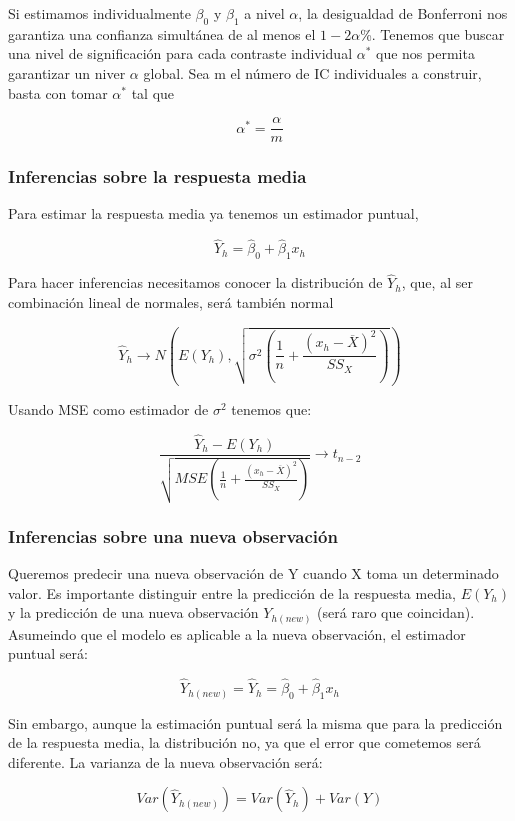Si estimamos individualmente $\beta_0$ y $\beta_1$ a nivel $\alpha$, la desigualdad de Bonferroni nos garantiza una confianza simultánea de al menos el $1-2\alpha$\%.
Tenemos que buscar una nivel de significación para cada contraste individual $\alpha^*$ que nos permita garantizar un niver $\alpha$ global. Sea m el número de IC individuales a construir, basta con tomar $\alpha^*$ tal que

$$
\alpha^*=\frac{\alpha}{m}
$$

\subsubsection{Inferencias sobre la respuesta media}

Para estimar la respuesta media ya tenemos un estimador puntual,

$$
\hat Y_h=\hat\beta_0+\hat\beta_1x_h
$$

Para hacer inferencias necesitamos conocer la distribución de $\hat Y_h$, que, al ser combinación lineal de normales, será también normal

$$
\hat Y_h\longrightarrow N\left(E(Y_h),\sqrt{\sigma^2\left(\frac{1}{n}+\frac{(x_h-\overline{X})^2}{SS_X}\right)}\right)
$$

Usando MSE como estimador de $\sigma^2$ tenemos que:

$$
\frac{\hat Y_h-E(Y_h)}{\sqrt{MSE\left(\frac{1}{n}+\frac{(x_h-\overline{X})^2}{SS_X}\right)}}\longrightarrow t_{n-2}
$$

\subsubsection{Inferencias sobre una nueva observación}

Queremos predecir una nueva observación de Y cuando X toma un determinado valor. Es importante distinguir entre la predicción de la respuesta media, $E(Y_h)$ y la predicción de una nueva observación $Y_{h(new)}$ (será raro que coincidan).
Asumeindo que el modelo es aplicable a la nueva observación, el estimador puntual será:

$$
\hat Y_{h(new)}=\hat Y_h=\hat\beta_0+\hat\beta_1x_h
$$

Sin embargo, aunque la estimación puntual será la misma que para la predicción de la respuesta media, la distribución no, ya que el error que cometemos será diferente.
La varianza de la nueva observación será: 

$$
Var(\hat Y_{h(new)})=Var(\hat Y_h)+ Var(Y)
$$

